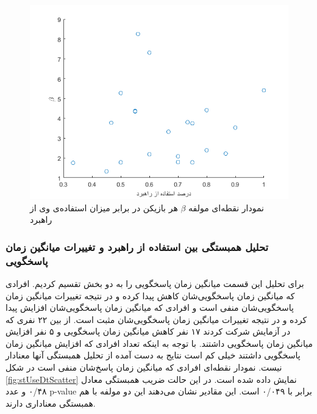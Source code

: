 \documentclass[twoside, a4paper,11pt]{book}
\numberwithin{equation}{chapter}
\numberwithin{table}{chapter}
\numberwithin{figure}{chapter}
\numberwithin{equation}{chapter}
\begin{document}
\begin{figure}
\centering
\includegraphics[scale=0.8]{Figures/betaStUseScatter.png}
\caption{\label{fig:betaStUseScatter}
نمودار نقطه‌ای مولفه $\beta$ هر بازیکن در برابر میزان استفاده‌ی وی از راهبرد
}
\end{figure}

\subsubsection{تحلیل همبستگی بین استفاده از راهبرد و تغییرات میانگین زمان پاسخگویی}

برای تحلیل این قسمت میانگین زمان پاسخگویی را به دو بخش تقسیم کردیم. افرادی که میانگین زمان پاسخگویی‌شان کاهش پیدا کرده و در نتیجه تغییرات میانگین زمان پاسخگویی‌شان منفی است و افرادی که میانگین زمان پاسخگویی‌شان افزایش پیدا کرده و در نتیجه تغییرات میانگین زمان پاسخگویی‌شان مثبت است. از بین ۲۲ نفری که در آزمایش شرکت کردند ۱۷ نفر کاهش میانگین زمان پاسخگویی و ۵ نفر افزایش میانگین زمان پاسخگویی داشتند. با توجه به اینکه تعداد افرادی که افزایش میانگین زمان پاسخگویی داشتند خیلی کم است نتایج به دست آمده از تحلیل همبستگی آنها معنادار نیست. نمودار نقطه‌ای افرادی که میانگین زمان پاسخ‌شان منفی است در شکل \ref{fig:stUseDtScatter} نمایش داده شده است. در این حالت ضریب همبستگی معادل ۰/۴۸ و عدد p-value برابر با ۰/۰۴۹ است. این مقادیر نشان می‌دهند این دو مولفه با هم همبستگی معناداری دارند.
\end{document}
